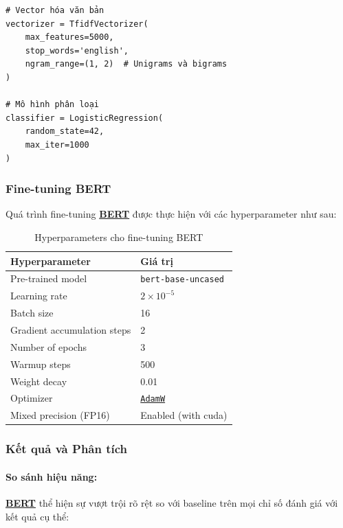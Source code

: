 \begin{verbatim}
# Vector hóa văn bản
vectorizer = TfidfVectorizer(
    max_features=5000,
    stop_words='english',
    ngram_range=(1, 2)  # Unigrams và bigrams
)

# Mô hình phân loại
classifier = LogisticRegression(
    random_state=42,
    max_iter=1000
)
\end{verbatim}

\subsubsection{Fine-tuning BERT}

Quá trình fine-tuning \hyperref[acro:bert]{\textbf{BERT}} được thực hiện với các hyperparameter như sau:

\begin{table}[H]
\centering
\caption{Hyperparameters cho fine-tuning BERT}
\label{tab:bert_hyperparams}
\begin{tabular}{ll}
\toprule
\textbf{Hyperparameter} & \textbf{Giá trị} \\
\midrule
Pre-trained model & \texttt{bert-base-uncased} \\
Learning rate & $2 \times 10^{-5}$ \\
Batch size & 16 \\
Gradient accumulation steps & 2 \\
Number of epochs & 3 \\
Warmup steps & 500 \\
Weight decay & 0.01 \\
Optimizer & \hyperref[acro:adamw]{\texttt{AdamW}} \cite{loshchilov2017decoupled} \\
Mixed precision (FP16) & Enabled (with cuda)\\
\bottomrule
\end{tabular}
\end{table}

\subsubsection{Kết quả và Phân tích}
\label{ssec:ket_qua_phan_tich}

\paragraph{So sánh hiệu năng:}

\hyperref[acro:bert]{\textbf{BERT}} thể hiện sự vượt trội rõ rệt so với baseline trên mọi chỉ số đánh giá với kết quả cụ thể:

